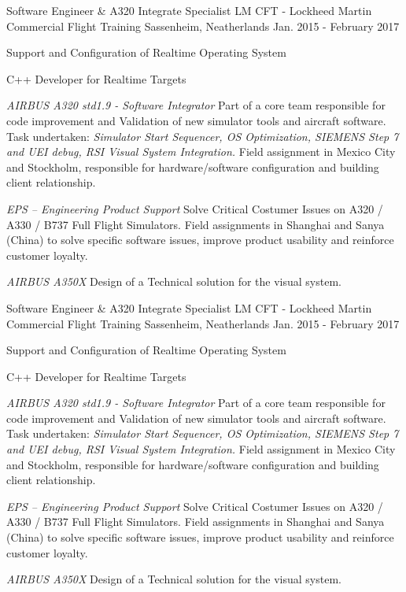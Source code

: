 \begin{cventries}
  \cventry
    {Software Engineer \& A320 Integrate Specialist}
    {LM CFT - Lockheed Martin Commercial Flight Training}
    {Sassenheim, Neatherlands}
    {Jan. 2015 - February 2017}
    {          
      \begin{cvitems}     
      \item{Support and Configuration of Realtime Operating System}
      \item{C++ Developer for Realtime Targets }
      \item {\textit{ AIRBUS A320 std1.9 - Software Integrator} Part of a core team responsible for code improvement and Validation of new simulator tools and aircraft software. Task undertaken: \textit{Simulator Start Sequencer, OS Optimization, SIEMENS Step 7 and  UEI debug, RSI Visual System Integration.} 
      Field assignment in Mexico City and Stockholm, responsible for hardware/software configuration and building client relationship.}
    \item {\textit{EPS – Engineering Product Support} Solve Critical Costumer  Issues on A320 / A330 / B737 Full Flight Simulators. Field assignments in Shanghai and Sanya (China) to  solve specific software issues, improve product usability and reinforce customer loyalty.}
       \item {\textit{AIRBUS A350X}  Design of a Technical solution for the visual system.}
       \end{cvitems}
    }
    
  \cventry
    {Software Engineer \& A320 Integrate Specialist}
    {LM CFT - Lockheed Martin Commercial Flight Training}
    {Sassenheim, Neatherlands}
    {Jan. 2015 - February 2017}
    {          
      \begin{cvitems}     
      \item{Support and Configuration of Realtime Operating System}
      \item{C++ Developer for Realtime Targets }
      \item {\textit{ AIRBUS A320 std1.9 - Software Integrator} Part of a core team responsible for code improvement and Validation of new simulator tools and aircraft software. Task undertaken: \textit{Simulator Start Sequencer, OS Optimization, SIEMENS Step 7 and  UEI debug, RSI Visual System Integration.} 
      Field assignment in Mexico City and Stockholm, responsible for hardware/software configuration and building client relationship.}
    \item {\textit{EPS – Engineering Product Support} Solve Critical Costumer  Issues on A320 / A330 / B737 Full Flight Simulators. Field assignments in Shanghai and Sanya (China) to  solve specific software issues, improve product usability and reinforce customer loyalty.}
       \item {\textit{AIRBUS A350X}  Design of a Technical solution for the visual system.}
       \end{cvitems}
    }



\end{cventries}
